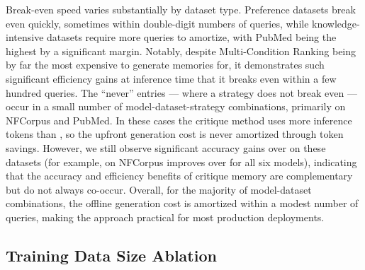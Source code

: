 Break-even speed varies substantially by dataset type. Preference datasets break even quickly, sometimes within double-digit numbers of queries, while knowledge-intensive datasets require more queries to amortize, with PubMed being the highest by a significant margin. Notably, despite Multi-Condition Ranking being by far the most expensive to generate memories for, it demonstrates such significant efficiency gains at inference time that it breaks even within a few hundred queries. The ``never'' entries --- where a strategy does not break even --- occur in a small number of model-dataset-strategy combinations, primarily \SEMCRIT{} on NFCorpus and PubMed. In these cases the critique method uses more inference tokens than \EPLABEL{}, so the upfront generation cost is never amortized through token savings. However, we still observe significant accuracy gains over \EPLABEL{} on these datasets (for example, on NFCorpus \EPSEMCRIT{} improves over \EPLABEL{} for all six models), indicating that the accuracy and efficiency benefits of critique memory are complementary but do not always co-occur. Overall, for the majority of model-dataset combinations, the offline generation cost is amortized within a modest number of queries, making the approach practical for most production deployments.

\subsection{Training Data Size Ablation}

